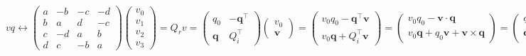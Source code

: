 \documentclass[
]{book}
\theoremstyle{definition}
\theoremstyle{definition}
\theoremstyle{definition}
\theoremstyle{definition}
\theoremstyle{remark}
\begin{document}
\[
vq\leftrightarrow\begin{pmatrix}a & -b & -c & -d\\
b & a & d & -c\\
c & -d & a & b\\
d & c & -b & a
\end{pmatrix}\begin{pmatrix}v_{{\scriptscriptstyle 0}}\\
v_{{\scriptscriptstyle 1}}\\
v_{{\scriptscriptstyle 2}}\\
v_{{\scriptscriptstyle 3}}
\end{pmatrix}=Q_{{\scriptscriptstyle r}}v=\begin{pmatrix}q_{{\scriptscriptstyle 0}} & -\boldsymbol{q}^{\intercal}\\
\boldsymbol{q} & Q_{{\scriptscriptstyle i}}^{\intercal}
\end{pmatrix}\begin{pmatrix}v_{{\scriptscriptstyle 0}}\\
\boldsymbol{v}
\end{pmatrix}=\begin{pmatrix}v_{{\scriptscriptstyle 0}}q_{{\scriptscriptstyle 0}}-\boldsymbol{q}^{\intercal}\boldsymbol{v}\\
v_{{\scriptscriptstyle 0}}\boldsymbol{q}+Q_{{\scriptscriptstyle i}}^{\intercal}\boldsymbol{v}
\end{pmatrix}=\begin{pmatrix}v_{{\scriptscriptstyle 0}}q_{{\scriptscriptstyle 0}}-\boldsymbol{v}\cdot\boldsymbol{q}\\
v_{{\scriptscriptstyle 0}}\boldsymbol{q}+q_{{\scriptscriptstyle 0}}\boldsymbol{v}+\boldsymbol{v}\times\boldsymbol{q}
\end{pmatrix}=\begin{pmatrix}q_{{\scriptscriptstyle 0}}v_{{\scriptscriptstyle 0}}-\boldsymbol{q}\cdot\boldsymbol{v}\\
\boldsymbol{q}v_{{\scriptscriptstyle 0}}+q_{{\scriptscriptstyle 0}}\boldsymbol{v}-\boldsymbol{q}\times\boldsymbol{v}
\end{pmatrix}
\]
\end{document}
